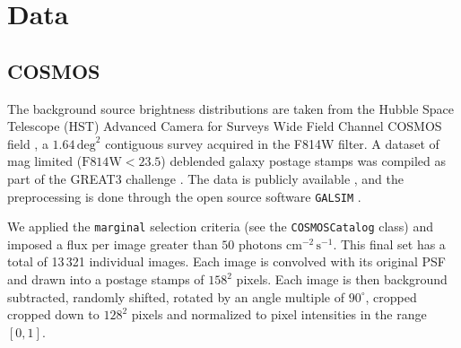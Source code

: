 



\section{Data}\label{sec:data}

\subsection{COSMOS}\label{sec:source}
The background source brightness distributions are taken from the Hubble Space Telescope (HST) 
Advanced Camera for Surveys Wide Field Channel COSMOS field \citep{Koekemoer2007,Scoville2007},
a $1.64\,\mathrm{deg}^{2}$ contiguous survey acquired in the F814W filter. 
A dataset of mag limited ($\mathrm{F814W} < 23.5$) deblended galaxy postage stamps \citep{Leauthaud2007} was compiled as 
part of the GREAT3 challenge \citep{Mandelbaum2014}. The data is 
publicly available \citep{Mandelbaum2012}, and the preprocessing is done through the open source software 
\texttt{GALSIM} \citep{Rowe2015}. \par

We applied the 
\texttt{marginal} selection criteria (see the \texttt{COSMOSCatalog} class) and imposed a flux per image
greater than $50\,\,\mathrm{photons}\,\,\mathrm{cm}^{-2}\,\mathrm{s}^{-1}$. 
This final set has a total of 13\,321 individual images.
Each image is convolved with its original PSF and drawn into a postage stamps of $158^2$ pixels. 
Each image is then 
background subtracted, randomly shifted, rotated by an angle multiple of $90^\circ$, cropped 
cropped down to $128^{2}$ pixels and normalized to pixel intensities in the range $[0,1]$.

